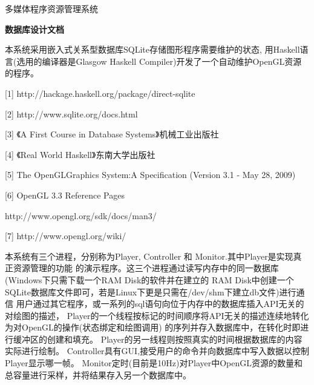 \documentclass[12pt,a4paper]{article}
\begin{document}
\begin{center}
{
\hei
\vspace{80mm}
{\fontsize{32}{48}\selectfont 多媒体程序资源管理系统}

\vspace{30mm}
\textbf{\Huge{数据库设计文档}}\vspace{30mm}
}
\end{center}

\pagebreak

\vspace{2mm}

本系统采用嵌入式关系型数据库SQLite存储图形程序需要维护的状态,%
用Haskell语言(选用的编译器是Glasgow Haskell Compiler)开发了一个自动维护OpenGL资源%
的程序。

\vspace{12mm}\vspace{2mm}

[1] http://hackage.haskell.org/package/direct-sqlite

[2] http://www.sqlite.org/docs.html

[3] 《A First Course in Database Systems》\hfill 机械工业出版社

[4] 《Real World Haskell》\hfill 东南大学出版社

[5] The OpenGL\textregistered  Graphics System:A Specification (Version 3.1 - May 28, 2009)

[6] OpenGL 3.3 Reference Pages 
	
	\hspace{10mm} http://www.opengl.org/sdk/docs/man3/

[7] http://www.opengl.org/wiki/

\vspace{12mm}\vspace{2mm}

本系统有三个进程，分别称为Player, Controller 和 Monitor.其中Player是实现真正资源管理的功能%
的演示程序。这三个进程通过读写内存中的同一数据库(Windows下只需下载一个RAM Disk的软件并在建立的%
RAM Disk中创建一个SQLite数据库文件即可，若是Linux下更是只需在/dev/shm下建立db文件)进行通信%
用户通过其它程序，或一系列的sql语句向位于内存中的数据库插入API无关的对绘图的描述，%
Player的一个线程按标记的时间顺序将API无关的描述连续地转化为对OpenGL的操作(状态绑定和绘图调用)%
的序列并存入数据库中，在转化时即进行缓冲区的创建和填充。%
Player的另一线程则按照真实的时间根据数据库的内容实际进行绘制。%
Controller具有GUI,接受用户的命令并向数据库中写入数据以控制Player显示哪一帧。%
Monitor定时(目前是10Hz)对Player中OpenGL资源的数量和总容量进行采样，并将结果存入另一个数据库中。%
\end{document}
